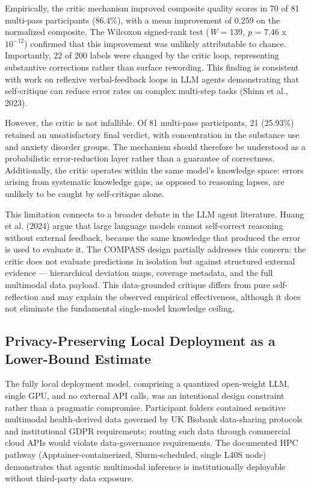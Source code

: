 \documentclass[11pt,a4paper,twoside]{article}
\begin{document}
Empirically, the critic mechanism improved composite quality scores in 70 of 81 multi-pass participants (86.4\%), with a mean improvement of 0.259 on the normalized composite. The Wilcoxon signed-rank test (\textit{W} = 139, \textit{p} = 7.46 x $10^{-12}$) confirmed that this improvement was unlikely attributable to chance. Importantly, 22 of 200 labels were changed by the critic loop, representing substantive corrections rather than surface rewording. This finding is consistent with work on reflexive verbal-feedback loops in LLM agents demonstrating that self-critique can reduce error rates on complex multi-step tasks (Shinn et al., 2023).

However, the critic is not infallible. Of 81 multi-pass participants, 21 (25.93\%) retained an unsatisfactory final verdict, with concentration in the substance use and anxiety disorder groups. The mechanism should therefore be understood as a probabilistic error-reduction layer rather than a guarantee of correctness. Additionally, the critic operates within the same model's knowledge space: errors arising from systematic knowledge gaps, as opposed to reasoning lapses, are unlikely to be caught by self-critique alone.

This limitation connects to a broader debate in the LLM agent literature. Huang et al. (2024) argue that large language models cannot self-correct reasoning without external feedback, because the same knowledge that produced the error is used to evaluate it. The COMPASS design partially addresses this concern: the critic does not evaluate predictions in isolation but against structured external evidence --- hierarchical deviation maps, coverage metadata, and the full multimodal data payload. This data-grounded critique differs from pure self-reflection and may explain the observed empirical effectiveness, although it does not eliminate the fundamental single-model knowledge ceiling.

\subsection{Privacy-Preserving Local Deployment as a Lower-Bound Estimate}

The fully local deployment model, comprising a quantized open-weight LLM, single GPU, and no external API calls, was an intentional design constraint rather than a pragmatic compromise. Participant folders contained sensitive multimodal health-derived data governed by UK Biobank data-sharing protocols and institutional GDPR requirements; routing such data through commercial cloud APIs would violate data-governance requirements. The documented HPC pathway (Apptainer-containerized, Slurm-scheduled, single L40S node) demonstrates that agentic multimodal inference is institutionally deployable without third-party data exposure.
\end{document}

